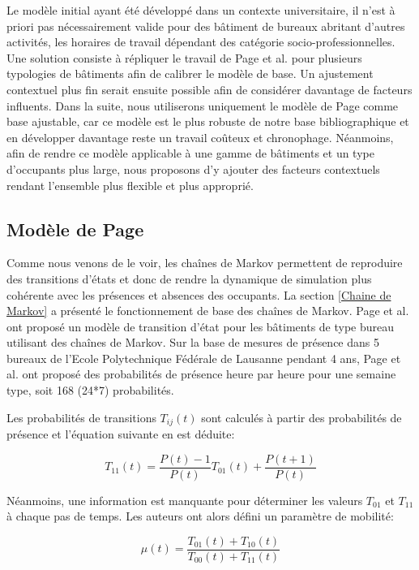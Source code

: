 Le modèle initial ayant été développé dans un contexte universitaire, il n'est à priori pas nécessairement valide pour des bâtiment de bureaux abritant d'autres activités, les horaires de travail dépendant des catégorie socio-professionnelles. Une solution consiste à répliquer le travail de Page et al. \cite{Page-08} pour plusieurs typologies de bâtiments afin de calibrer le modèle de base. Un ajustement contextuel plus fin serait ensuite possible afin de considérer davantage de facteurs influents. Dans la suite, nous utiliserons uniquement le modèle de Page comme base ajustable, car ce modèle est le plus robuste de notre base bibliographique et en développer davantage reste un travail coûteux et chronophage. Néanmoins, afin de rendre ce modèle applicable à une gamme de bâtiments et un type d'occupants plus large, nous proposons d'y ajouter des facteurs contextuels rendant l'ensemble plus flexible et plus approprié.

\subsection{Modèle de Page}

Comme nous venons de le voir, les chaînes de Markov permettent de reproduire des transitions d'états et donc de rendre la dynamique de simulation plus cohérente avec les présences et absences des occupants. La section \ref{Chaine de Markov} a présenté le fonctionnement de base des chaînes de Markov. Page et al. \cite{Page-08} ont proposé un modèle de transition d'état pour les bâtiments de type bureau utilisant des chaînes de Markov. Sur la base de mesures de présence dans 5 bureaux de l'Ecole Polytechnique Fédérale de Lausanne pendant 4 ans, Page et al. ont proposé des probabilités de présence heure par heure pour une semaine type, soit 168 (24*7) probabilités. 

Les probabilités de transitions $T_{ij}(t)$ sont calculés à partir des probabilités de présence et l'équation suivante en est déduite:

\begin{equation}
T_{11}(t)=\dfrac{P(t)-1}{P(t)}T_{01}(t)+\dfrac{P(t+1)}{P(t)}
\label{T110}
\end{equation}

Néanmoins, une information est manquante pour déterminer les valeurs $T_{01}$ et $T_{11}$ à chaque pas de temps. Les auteurs ont alors défini un paramètre de mobilité:

\begin{equation}
\mu(t)=\dfrac{T_{01}(t)+T_{10}(t)}{T_{00}(t)+T_{11}(t)}
\label{mu}
\end{equation}

